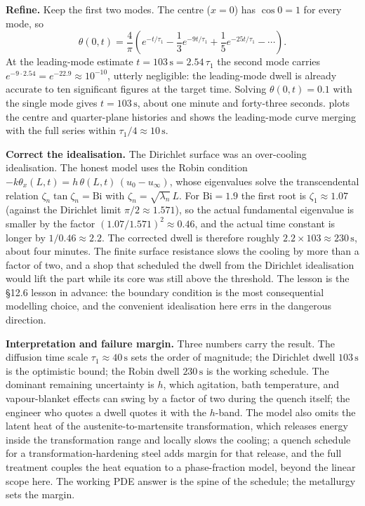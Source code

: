 \textbf{Refine.} Keep the first two modes. The centre
($x = 0$) has $\cos 0 = 1$ for every mode, so
\[
\theta(0, t) = \frac{4}{\pi}\left(e^{-t/\tau_{1}} - \frac{1}{3}e^{-9 t/\tau_{1}} + \frac{1}{5}e^{-25 t/\tau_{1}} - \cdots\right).
\]
At the leading-mode estimate $t = 103\,\si{\second} = 2.54\,\tau_{1}$
the second mode carries $e^{-9 \cdot 2.54} = e^{-22.9} \approx
10^{-10}$, utterly negligible: the leading-mode dwell is already
accurate to ten significant figures at the target time. Solving
$\theta(0, t) = 0.1$ with the single mode gives $t = 103\,\si{
\second}$, about one minute and forty-three seconds.
 plots the centre and
quarter-plane histories and shows the leading-mode curve merging
with the full series within $\tau_{1}/4 \approx 10\,\si{\second}$.



\textbf{Correct the idealisation.} The Dirichlet surface was an
over-cooling idealisation. The honest model uses the Robin condition
$-k\theta_{x}(L, t) = h\,\theta(L, t)\,(u_{0} - u_{\infty})$, whose
eigenvalues solve the transcendental relation $\zeta_{n}\tan\zeta_{n}
= \text{Bi}$ with $\zeta_{n} = \sqrt{\lambda_{n}}\,L$. For
$\text{Bi} = 1.9$ the first root is $\zeta_{1} \approx 1.07$
(against the Dirichlet limit $\pi/2 \approx 1.571$), so the actual
fundamental eigenvalue is smaller by the factor
$(1.07/1.571)^{2} \approx 0.46$, and the actual time constant is
longer by $1/0.46 \approx 2.2$. The corrected dwell is therefore
roughly $2.2 \times 103 \approx 230\,\si{\second}$, about four
minutes. The finite surface resistance slows the cooling by more
than a factor of two, and a shop that scheduled the dwell from the
Dirichlet idealisation would lift the part while its core was still
above the threshold. The lesson is the §12.6 lesson in advance: the
boundary condition is the most consequential modelling choice, and
the convenient idealisation here errs in the dangerous direction.

\textbf{Interpretation and failure margin.} Three numbers carry the
result. The diffusion time scale $\tau_{1} \approx 40\,\si{\second}$
sets the order of magnitude; the Dirichlet dwell $103\,\si{\second}$
is the optimistic bound; the Robin dwell $230\,\si{\second}$ is the
working schedule. The dominant remaining uncertainty is $h$, which
agitation, bath temperature, and vapour-blanket effects can swing by
a factor of two during the quench itself; the engineer who quotes a
dwell quotes it with the $h$-band. The model also omits the
latent heat of the austenite-to-martensite transformation, which
releases energy inside the transformation range and locally slows
the cooling; a quench schedule for a transformation-hardening steel
adds margin for that release, and the full treatment couples the
heat equation to a phase-fraction model, beyond the linear scope
here. The working PDE answer is the spine of the schedule; the
metallurgy sets the margin.

